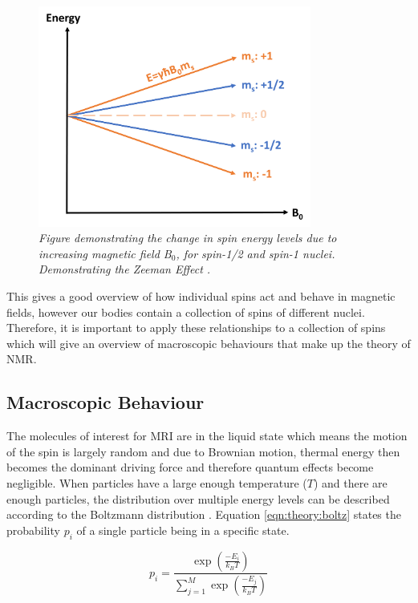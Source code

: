 \begin{figure}
    \centering
    \includegraphics[width=0.8\textwidth]{Figures/Theory/Zeeman.png}
    \caption{\textit{Figure demonstrating the change in spin energy levels due to increasing magnetic field B$_0$, for spin-1/2 and spin-1 nuclei. Demonstrating the Zeeman Effect \cite{Zeeman1896VerslagenAfdeeling}.}}
    \label{fig:theory:zeeman}
\end{figure}

This gives a good overview of how individual spins act and behave in magnetic fields, however our bodies contain a collection of spins of different nuclei. Therefore, it is important to apply these relationships to a collection of spins which will give an overview of macroscopic behaviours that make up the theory of \ac{NMR}.

\subsection{Macroscopic Behaviour}

The molecules of interest for \ac{MRI} are in the liquid state which means the motion of the spin is largely random and due to Brownian motion, thermal energy then becomes the dominant driving force and therefore quantum effects become negligible. When particles have a large enough temperature ($T$) and there are enough particles, the distribution over multiple energy levels can be described according to the Boltzmann distribution \cite{Boltzmann1872WeitereGasmolekulen}. Equation \ref{eqn:theory:boltz} states the probability $p_i$ of a single particle being in a specific state.

\begin{equation}
    p_i = \frac{\exp\left(\frac{-E_i}{k_BT}\right)}{\displaystyle \sum_{j = 1}^{M}\exp\left(\frac{-E_j}{k_BT}\right)}
    \label{eqn:theory:boltz}
\end{equation}


